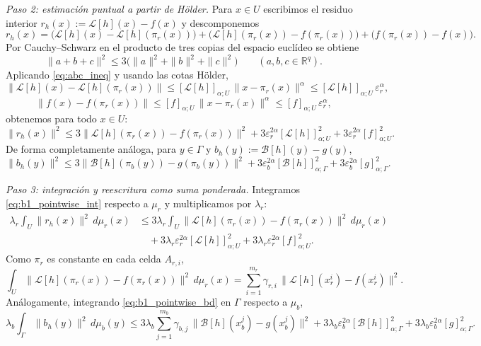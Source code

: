 \smallskip
\noindent\textit{Paso 2: estimación puntual a partir de Hölder.}
Para $x\in U$ escribimos el residuo interior $r_h(x):=\mathcal L[h](x)-f(x)$ y descomponemos
\[
r_h(x)=\big(\mathcal L[h](x)-\mathcal L[h](\pi_r(x))\big)+\big(\mathcal L[h](\pi_r(x))-f(\pi_r(x))\big)+\big(f(\pi_r(x))-f(x)\big).
\]
Por Cauchy--Schwarz en el producto de tres copias del espacio euclídeo se obtiene
\begin{equation}\label{eq:abc_ineq}
\|a+b+c\|^2\le 3\big(\|a\|^2+\|b\|^2+\|c\|^2\big)\qquad(a,b,c\in\mathbb{R}^q).
\end{equation}
Aplicando \eqref{eq:abc_ineq} y usando las cotas Hölder,
\[
\|\mathcal L[h](x)-\mathcal L[h](\pi_r(x))\|\le [\mathcal L[h]]_{\alpha;U}\,\|x-\pi_r(x)\|^\alpha\le [\mathcal L[h]]_{\alpha;U}\,\varepsilon_r^\alpha,
\]
\[
\|f(x)-f(\pi_r(x))\|\le [f]_{\alpha;U}\,\|x-\pi_r(x)\|^\alpha\le [f]_{\alpha;U}\,\varepsilon_r^\alpha,
\]
obtenemos para todo $x\in U$:
\begin{equation}\label{eq:b1_pointwise_int}
\|r_h(x)\|^2
\le 3\|\mathcal L[h](\pi_r(x))-f(\pi_r(x))\|^2
+3\varepsilon_r^{2\alpha}[\mathcal L[h]]_{\alpha;U}^2
+3\varepsilon_r^{2\alpha}[f]_{\alpha;U}^2.
\end{equation}
De forma completamente análoga, para $y\in\Gamma$ y $b_h(y):=\mathcal B[h](y)-g(y)$,
\begin{equation}\label{eq:b1_pointwise_bd}
\|b_h(y)\|^2
\le 3\|\mathcal B[h](\pi_b(y))-g(\pi_b(y))\|^2
+3\varepsilon_b^{2\alpha}[\mathcal B[h]]_{\alpha;\Gamma}^2
+3\varepsilon_b^{2\alpha}[g]_{\alpha;\Gamma}^2.
\end{equation}

\smallskip
\noindent\textit{Paso 3: integración y reescritura como suma ponderada.}
Integramos \eqref{eq:b1_pointwise_int} respecto a $\mu_r$ y multiplicamos por $\lambda_r$:
\begin{align*}
\lambda_r\int_U \|r_h(x)\|^2\,d\mu_r(x)
&\le 3\lambda_r\int_U \|\mathcal L[h](\pi_r(x))-f(\pi_r(x))\|^2\,d\mu_r(x) \\
&\quad +3\lambda_r\varepsilon_r^{2\alpha}[\mathcal L[h]]_{\alpha;U}^2
 +3\lambda_r\varepsilon_r^{2\alpha}[f]_{\alpha;U}^2.
\end{align*}
Como $\pi_r$ es constante en cada celda $A_{r,i}$,
\[
\int_U \|\mathcal L[h](\pi_r(x))-f(\pi_r(x))\|^2\,d\mu_r(x)
=\sum_{i=1}^{m_r}\gamma_{r,i}\,\|\mathcal L[h](x_r^i)-f(x_r^i)\|^2.
\]
Análogamente, integrando \eqref{eq:b1_pointwise_bd} en $\Gamma$ respecto a $\mu_b$,
\[
\lambda_b\int_\Gamma \|b_h(y)\|^2\,d\mu_b(y)
\le 3\lambda_b\sum_{j=1}^{m_b}\gamma_{b,j}\,\|\mathcal B[h](x_b^j)-g(x_b^j)\|^2
+3\lambda_b\varepsilon_b^{2\alpha}[\mathcal B[h]]_{\alpha;\Gamma}^2
+3\lambda_b\varepsilon_b^{2\alpha}[g]_{\alpha;\Gamma}^2.
\]

